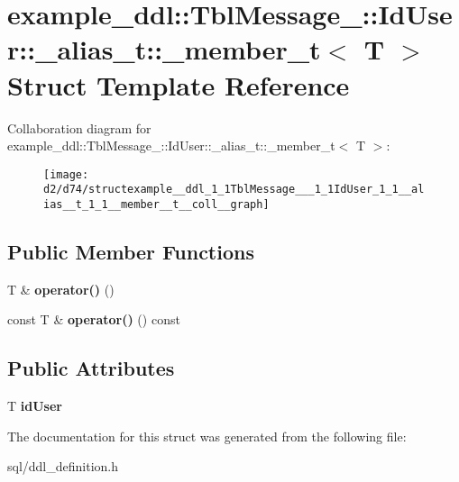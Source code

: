 \hypertarget{structexample__ddl_1_1TblMessage___1_1IdUser_1_1__alias__t_1_1__member__t}{}\section{example\+\_\+ddl\+:\+:Tbl\+Message\+\_\+\+:\+:Id\+User\+:\+:\+\_\+alias\+\_\+t\+:\+:\+\_\+member\+\_\+t$<$ T $>$ Struct Template Reference}
\label{structexample__ddl_1_1TblMessage___1_1IdUser_1_1__alias__t_1_1__member__t}


Collaboration diagram for example\+\_\+ddl\+:\+:Tbl\+Message\+\_\+\+:\+:Id\+User\+:\+:\+\_\+alias\+\_\+t\+:\+:\+\_\+member\+\_\+t$<$ T $>$\+:
\nopagebreak
\begin{figure}[H]
\begin{center}
\leavevmode
\texttt{[image: d2/d74/structexample\_\_ddl\_1\_1TblMessage\_\_\_1\_1IdUser\_1\_1\_\_alias\_\_t\_1\_1\_\_member\_\_t\_\_coll\_\_graph]}
\end{center}
\end{figure}
\subsection*{Public Member Functions}
\begin{DoxyCompactItemize}
\item 
\hypertarget{structexample__ddl_1_1TblMessage___1_1IdUser_1_1__alias__t_1_1__member__t_a91984e2eafe1ae403f86ea55f8a5d335}{}T \& {\bfseries operator()} ()\label{structexample__ddl_1_1TblMessage___1_1IdUser_1_1__alias__t_1_1__member__t_a91984e2eafe1ae403f86ea55f8a5d335}

\item 
\hypertarget{structexample__ddl_1_1TblMessage___1_1IdUser_1_1__alias__t_1_1__member__t_a47c5ab4f8a4d54bfeea4244158e4723e}{}const T \& {\bfseries operator()} () const \label{structexample__ddl_1_1TblMessage___1_1IdUser_1_1__alias__t_1_1__member__t_a47c5ab4f8a4d54bfeea4244158e4723e}

\end{DoxyCompactItemize}
\subsection*{Public Attributes}
\begin{DoxyCompactItemize}
\item 
\hypertarget{structexample__ddl_1_1TblMessage___1_1IdUser_1_1__alias__t_1_1__member__t_a74b2476c2ce5ca370fd3e82bd46a32e2}{}T {\bfseries id\+User}\label{structexample__ddl_1_1TblMessage___1_1IdUser_1_1__alias__t_1_1__member__t_a74b2476c2ce5ca370fd3e82bd46a32e2}

\end{DoxyCompactItemize}


The documentation for this struct was generated from the following file\+:\begin{DoxyCompactItemize}
\item 
sql/ddl\+\_\+definition.\+h\end{DoxyCompactItemize}
